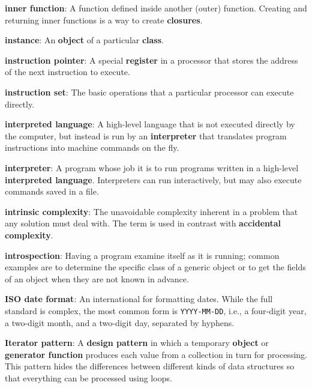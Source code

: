 \documentclass[krantzl]{krantz}
\newcommand{\glosskey}[1]{\textbf{#1}}
\begin{document}
\noindent \textbf{{\newline}\glosskey{inner function}}: 
A function defined inside another (outer) function.  Creating and returning inner functions is a way to create \glosskey{closures}.


\noindent \textbf{{\newline}\glosskey{instance}}: 
An \glosskey{object} of a particular \glosskey{class}.


\noindent \textbf{{\newline}\glosskey{instruction pointer}}: 
A special \glosskey{register} in a processor that stores the address of the next instruction to execute.


\noindent \textbf{{\newline}\glosskey{instruction set}}: 
The basic operations that a particular processor can execute directly.


\noindent \textbf{{\newline}\glosskey{interpreted language}}: 
A high-level language that is not executed directly by the computer, but instead is run by an \glosskey{interpreter} that translates program instructions into machine commands on the fly.


\noindent \textbf{{\newline}\glosskey{interpreter}}: 
A program whose job it is to run programs written in a high-level \glosskey{interpreted language}. Interpreters can run interactively, but may also execute commands saved in a file.


\noindent \textbf{{\newline}\glosskey{intrinsic complexity}}: 
The unavoidable complexity inherent in a problem that any solution must deal with. The term is used in contrast with \glosskey{accidental complexity}.


\noindent \textbf{{\newline}\glosskey{introspection}}: 
Having a program examine itself as it is running; common examples are to determine the specific class of a generic object or to get the fields of an object when they are not known in advance.


\noindent \textbf{{\newline}\glosskey{ISO date format}}: 
An international for formatting dates. While the full standard is complex, the most common form is \texttt{YYYY-MM-DD}, i.e., a four-digit year, a two-digit month, and a two-digit day, separated by hyphens.


\noindent \textbf{{\newline}\glosskey{Iterator pattern}}: 
A \glosskey{design pattern} in which a temporary \glosskey{object} or \glosskey{generator function} produces each value from a collection in turn for processing. This pattern hides the differences between different kinds of data structures so that everything can be processed using loops.
\end{document}
